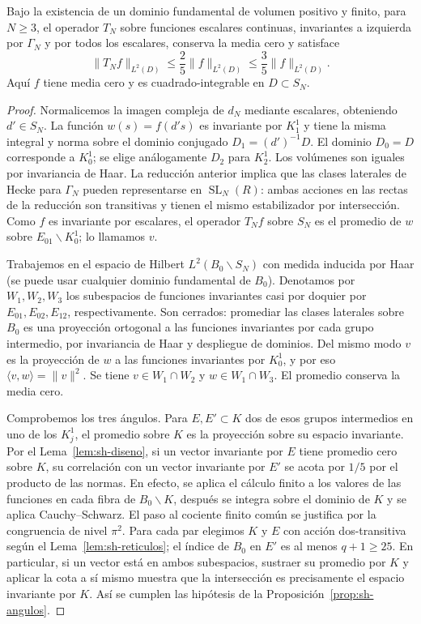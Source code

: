 \begin{teorema}
\label{thm:sh-gap}
Bajo la existencia de un dominio fundamental de volumen positivo y finito, para $N\ge3$, el operador $T_N$ sobre funciones escalares continuas, invariantes a izquierda por $\Gamma_N$ y por todos los escalares, conserva la media cero y satisface
\begin{equation}
 \|T_N f\|_{L^2(D)}\le\frac25\|f\|_{L^2(D)}\le\frac35\|f\|_{L^2(D)}.
 \label{eq:sh-gap}
\end{equation}
Aquí $f$ tiene media cero y es cuadrado-integrable en $D\subset S_N$.
\end{teorema}
\begin{proof}
Normalicemos la imagen compleja de $d_N$ mediante escalares, obteniendo $d'\in S_N$. La función $w(s)=f(d's)$ es invariante por $K_1^1$ y tiene la misma integral y norma sobre el dominio conjugado $D_1=(d')^{-1}D$. El dominio $D_0=D$ corresponde a $K_0^1$; se elige análogamente $D_2$ para $K_2^1$. Los volúmenes son iguales por invariancia de Haar. La reducción anterior implica que las clases laterales de Hecke para $\Gamma_N$ pueden representarse en $\operatorname{SL}_N(R)$: ambas acciones en las rectas de la reducción son transitivas y tienen el mismo estabilizador por intersección. Como $f$ es invariante por escalares, el operador $T_N f$ sobre $S_N$ es el promedio de $w$ sobre $E_{01}\backslash K_0^1$; lo llamamos $v$.

Trabajemos en el espacio de Hilbert $L^2(B_0\backslash S_N)$ con medida inducida por Haar (se puede usar cualquier dominio fundamental de $B_0$). Denotamos por $W_1,W_2,W_3$ los subespacios de funciones invariantes casi por doquier por $E_{01},E_{02},E_{12}$, respectivamente. Son cerrados: promediar las clases laterales sobre $B_0$ es una proyección ortogonal a las funciones invariantes por cada grupo intermedio, por invariancia de Haar y despliegue de dominios. Del mismo modo $v$ es la proyección de $w$ a las funciones invariantes por $K_0^1$, y por eso $\langle v,w\rangle=\|v\|^2$. Se tiene $v\in W_1\cap W_2$ y $w\in W_1\cap W_3$. El promedio conserva la media cero.

Comprobemos los tres ángulos. Para $E,E'\subset K$ dos de esos grupos intermedios en uno de los $K_j^1$, el promedio sobre $K$ es la proyección sobre su espacio invariante. Por el Lema~\ref{lem:sh-diseno}, si un vector invariante por $E$ tiene promedio cero sobre $K$, su correlación con un vector invariante por $E'$ se acota por $1/5$ por el producto de las normas. En efecto, se aplica el cálculo finito a los valores de las funciones en cada fibra de $B_0\backslash K$, después se integra sobre el dominio de $K$ y se aplica Cauchy--Schwarz. El paso al cociente finito común se justifica por la congruencia de nivel $\pi^2$. Para cada par elegimos $K$ y $E$ con acción dos-transitiva según el Lema~\ref{lem:sh-reticulos}; el índice de $B_0$ en $E'$ es al menos $q+1\ge25$. En particular, si un vector está en ambos subespacios, sustraer su promedio por $K$ y aplicar la cota a sí mismo muestra que la intersección es precisamente el espacio invariante por $K$. Así se cumplen las hipótesis de la Proposición~\ref{prop:sh-angulos}.


\end{proof}
